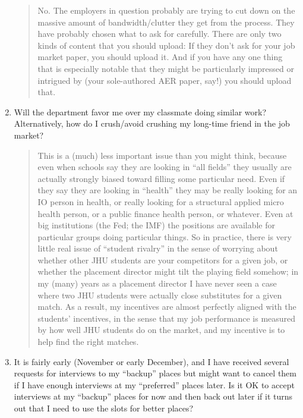 \documentclass{\classes/econtex}
\begin{document}
\begin{enumerate}
    \begin{quote}
    No. The employers in question probably are trying to cut down on the massive amount of bandwidth/clutter they get from the process.  They have probably chosen what to ask for carefully.  There are only two kinds of content that you should upload: If they don't ask for your job market paper, you should upload it. And if you have any one thing that is especially notable that they might be particularly impressed or intrigued by (your sole-authored AER paper, say!) you should upload that.

  \end{quote}
\item  Will the department favor me over my classmate doing similar work?  Alternatively, how do I crush/avoid crushing my long-time friend in the job market?

  \begin{quote}
    This is a (much) less important issue than you might think, because even when schools say they are looking in ``all fields'' they usually are actually strongly biased toward filling some particular need.  Even if they say they are looking in ``health'' they may be really looking for an IO person in health, or really looking for a structural applied micro health person, or a public finance health person, or whatever.  Even at big institutions (the Fed; the IMF) the positions are available for particular groups doing particular things.  So in practice, there is very little real issue of ``student rivalry'' in the sense of worrying about whether other JHU students are your competitors for a given job, or whether the placement director might tilt the playing field somehow; in my (many) years as a placement director I have never seen a case where two JHU students were actually close substitutes for a given match.  As a result, my incentives are almost perfectly aligned with the students' incentives, in the sense that my job performance is measured by how well JHU students do on the market, and my incentive is to help find the right matches.

  \end{quote}

\item  It is fairly early (November or early December), and I have received several requests for interviews to my ``backup'' places but might want to cancel them if I have enough interviews at my ``preferred'' places later.  Is it OK to accept interviews at my ``backup'' places for now and then back out later if it turns out that I need to use the slots for better places?


\end{enumerate}
\end{document}
